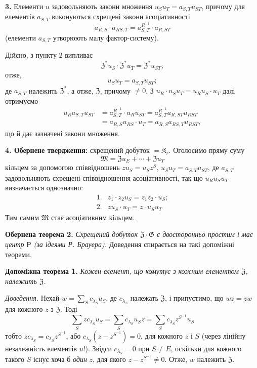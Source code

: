 \documentclass[11pt]{article}
\begin{document}
\noindent\textbf{3.} Елементи \(u\) задовольняють закони множення \(u_Su_T=a_{S,T}u_{ST}\), причому для елементів \(a_{S,T}\) виконуються схрещені закони асоціативності
\[
a_{R,S}\cdot a_{RS,T}=a_{S,T}^{R^{-1}}\cdot a_{R,ST}
\]
(елементи \(a_{S,T}\) утворюють малу фактор-систему).

Дійсно, з пункту 2 випливає
\[
\mathfrak Z^*u_S\cdot\mathfrak Z^*u_T=\mathfrak Z^*u_{ST};
\]
отже,
\[
u_Su_T=a_{S,T}u_{ST};
\]
де \(a_{S,T}\) належить \(\mathfrak Z^*\), а отже, \(\mathfrak Z\), причому \(\neq0\). З \(u_R\cdot u_Su_T=u_Ru_S\cdot u_T\) далі отримуємо
\[
\begin{aligned}
u_Ra_{S,T}u_{ST}
&=a_{S,T}^{R^{-1}}\cdot u_Ru_{ST}
 =a_{S,T}^{R^{-1}}a_{R,ST}u_{RST}\\
&=a_{R,S}u_{RS}\cdot u_T
 =a_{R,S}a_{RS,T}u_{RST},
\end{aligned}
\]
що й дає зазначені закони множення.

\noindent\textbf{4. Обернене твердження:} схрещений добуток \(=\mathfrak K_r\). Оголосимо пряму суму
\[
\mathfrak M=\mathfrak Zu_E+\cdots+\mathfrak Zu_T
\]
кільцем за допомогою співвідношень \(zu_S=u_Sz^S\), \(u_Su_T=a_{S,T}u_{ST}\), де \(a_{S,T}\) задовольняють схрещені співвідношення асоціативності, так що \(u_Ru_Su_T\) визначається однозначно:
\[
\begin{array}{ll}
1.&z_1\cdot z_2u_S=z_1z_2\cdot u_S;\\[2pt]
2.&zu_S\cdot u_T=z\cdot u_Su_T
\end{array}
\]
Тим самим \(\mathfrak M\) стає асоціативним кільцем.

\noindent\textbf{Обернена теорема 2.} \emph{Схрещений добуток \(\mathfrak Z\cdot\mathfrak G\) є двосторонньо простим і має центр \(\mathsf{P}\) (за ідеями Р. Брауера).} Доведення спирається на такі допоміжні теореми.

\noindent\textbf{Допоміжна теорема 1.} \emph{Кожен елемент, що комутує з кожним елементом \(\mathfrak Z\), належить \(\mathfrak Z\).}

\noindent\emph{Доведення.} Нехай \(w=\sum_S c_{\lambda_S}u_S\), де \(c_{\lambda_S}\) належать \(\mathfrak Z\), і припустимо, що \(wz=zw\) для кожного \(z\) з \(\mathfrak Z\). Тоді
\[
\sum_S zc_{\lambda_S}u_S
 =\sum_S c_{\lambda_S}u_Sz
 =\sum_S c_{\lambda_S}z^{S^{-1}}u_S
\]
тобто \(zc_{\lambda_S}=c_{\lambda_S}z^{S^{-1}}\), або \(c_{\lambda_S}(z-z^{S^{-1}})=0\), для кожного \(z\) і \(S\) (через лінійну незалежність елементів \(u\)!). Звідси \(c_{\lambda_S}=0\) при \(S\neq E\), оскільки для кожного такого \(S\) існує хоча б \emph{один} \(z\), для якого \(z-z^{S^{-1}}\neq0\). Отже, \(w\) належить \(\mathfrak Z\).
\end{document}
